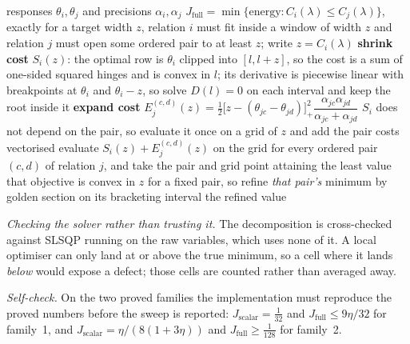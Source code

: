 \begin{algorithm}[htbp]
\caption{Exact least energy of a capacity-inverting alternative}
\label{alg:fn-jfull}
\begin{algorithmic}[1]
\REQUIRE responses $\theta_{i},\theta_{j}$ and precisions $\alpha_{i},\alpha_{j}$
\ENSURE $J_{\mathrm{full}}=\min\{\text{energy}:C_{i}(\lambda)\le C_{j}(\lambda)\}$, exactly
\STATE for a target width $z$, relation $i$ must fit inside a window of width $z$ and
       relation $j$ must open some ordered pair to at least $z$; write $z=C_{i}(\lambda)$
\STATE \textbf{shrink cost } $S_{i}(z)$: the optimal row is $\theta_{i}$ clipped into
       $[l,l+z]$, so the cost is a sum of one-sided squared hinges and is convex in $l$; its
       derivative is piecewise linear with breakpoints at $\theta_{i}$ and $\theta_{i}-z$,
       so solve $D(l)=0$ on each interval and keep the root inside it
\STATE \textbf{expand cost } $E^{(c,d)}_{j}(z)=\tfrac12\bigl[z-(\theta_{jc}-\theta_{jd})\bigr]_{+}^{2}
       \dfrac{\alpha_{jc}\alpha_{jd}}{\alpha_{jc}+\alpha_{jd}}$
\STATE $S_{i}$ does not depend on the pair, so evaluate it once on a grid of $z$ and add the
       pair costs vectorised
\STATE evaluate $S_{i}(z)+E^{(c,d)}_{j}(z)$ on the grid for every ordered pair $(c,d)$ of
       relation $j$, and take the pair and grid point attaining the least value
\STATE that objective is convex in $z$ for a fixed pair, so refine \emph{that pair's}
       minimum by golden section on its bracketing interval
\RETURN the refined value
\end{algorithmic}
\end{algorithm}

\emph{Checking the solver rather than trusting it.} The decomposition is cross-checked
against SLSQP running on the raw variables, which uses none of it. A local optimiser can only
land at or above the true minimum, so a cell where it lands \emph{below} would expose a
defect; those cells are counted rather than averaged away.

\emph{Self-check.} On the two proved families the implementation must reproduce the proved
numbers before the sweep is reported: $J_{\mathrm{scalar}}=\tfrac1{32}$ and
$J_{\mathrm{full}}\le 9\eta/32$ for family~1, and
$J_{\mathrm{scalar}}=\eta/(8(1+3\eta))$ and $J_{\mathrm{full}}\ge\tfrac1{128}$ for family~2.

